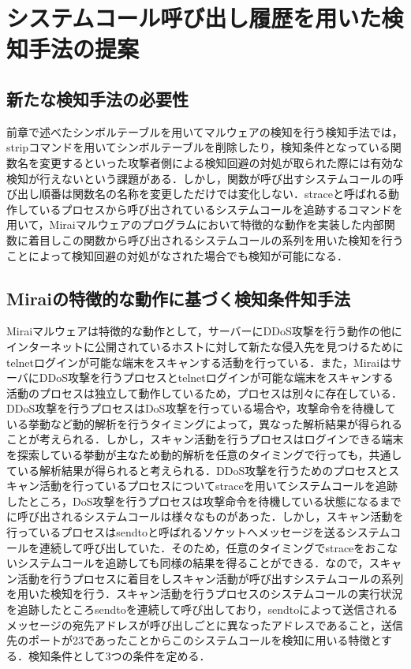 \chapter{システムコール呼び出し履歴を用いた検知手法の提案}

\section{新たな検知手法の必要性}
前章で述べたシンボルテーブルを用いてマルウェアの検知を行う検知手法では，stripコマンドを用いてシンボルテーブルを削除したり，検知条件となっている関数名を変更するといった攻撃者側による検知回避の対処が取られた際には有効な検知が行えないという課題がある．しかし，関数が呼び出すシステムコールの呼び出し順番は関数名の名称を変更しただけでは変化しない．straceと呼ばれる動作しているプロセスから呼び出されているシステムコールを追跡するコマンドを用いて，Miraiマルウェアのプログラムにおいて特徴的な動作を実装した内部関数に着目しこの関数から呼び出されるシステムコールの系列を用いた検知を行うことによって検知回避の対処がなされた場合でも検知が可能になる．



\section{Miraiの特徴的な動作に基づく検知条件知手法}
Miraiマルウェアは特徴的な動作として，サーバーにDDoS攻撃を行う動作の他にインターネットに公開されているホストに対して新たな侵入先を見つけるためにtelnetログインが可能な端末をスキャンする活動を行っている．また，MiraiはサーバにDDoS攻撃を行うプロセスとtelnetログインが可能な端末をスキャンする活動のプロセスは独立して動作しているため，プロセスは別々に存在している．DDoS攻撃を行うプロセスはDoS攻撃を行っている場合や，攻撃命令を待機している挙動など動的解析を行うタイミングによって，異なった解析結果が得られることが考えられる．しかし，スキャン活動を行うプロセスはログインできる端末を探索している挙動が主なため動的解析を任意のタイミングで行っても，共通している解析結果が得られると考えられる．DDoS攻撃を行うためのプロセスとスキャン活動を行っているプロセスについてstraceを用いてシステムコールを追跡したところ，DoS攻撃を行うプロセスは攻撃命令を待機している状態になるまでに呼び出されるシステムコールは様々なものがあった．しかし，スキャン活動を行っているプロセスはsendtoと呼ばれるソケットへメッセージを送るシステムコールを連続して呼び出していた．そのため，任意のタイミングでstraceをおこないシステムコールを追跡しても同様の結果を得ることができる．なので，スキャン活動を行うプロセスに着目をしスキャン活動が呼び出すシステムコールの系列を用いた検知を行う．スキャン活動を行うプロセスのシステムコールの実行状況を追跡したところsendtoを連続して呼び出しており，sendtoによって送信されるメッセージの宛先アドレスが呼び出しごとに異なったアドレスであること，送信先のポートが23であったことからこのシステムコールを検知に用いる特徴とする．検知条件として3つの条件を定める．

